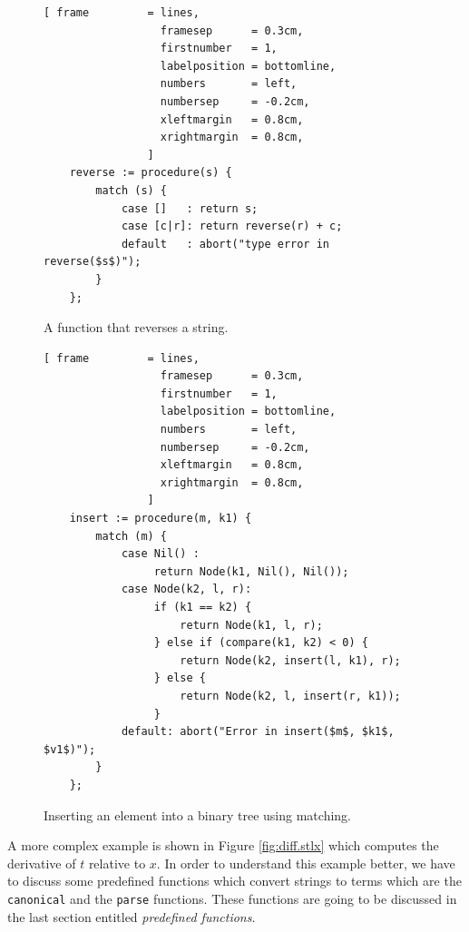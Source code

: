 \documentclass[11pt]{report}
\begin{document}
\begin{figure}[!ht]
\centering
\begin{Verbatim}[ frame         = lines, 
                  framesep      = 0.3cm, 
                  firstnumber   = 1,
                  labelposition = bottomline,
                  numbers       = left,
                  numbersep     = -0.2cm,
                  xleftmargin   = 0.8cm,
                  xrightmargin  = 0.8cm,
                ]
    reverse := procedure(s) {
        match (s) {
            case []   : return s;
            case [c|r]: return reverse(r) + c;
            default   : abort("type error in reverse($s$)");
        }
    };
\end{Verbatim}
\vspace*{-0.3cm}
\caption{A function that reverses a string.}
\label{fig:reverse.stlx}
\end{figure}

\begin{figure}[!ht]
\centering
\begin{Verbatim}[ frame         = lines, 
                  framesep      = 0.3cm, 
                  firstnumber   = 1,
                  labelposition = bottomline,
                  numbers       = left,
                  numbersep     = -0.2cm,
                  xleftmargin   = 0.8cm,
                  xrightmargin  = 0.8cm,
                ]
    insert := procedure(m, k1) {
        match (m) {
            case Nil() : 
                 return Node(k1, Nil(), Nil());
            case Node(k2, l, r): 
                 if (k1 == k2) {
                     return Node(k1, l, r);
                 } else if (compare(k1, k2) < 0) { 
                     return Node(k2, insert(l, k1), r);
                 } else {
                     return Node(k2, l, insert(r, k1));
                 }
            default: abort("Error in insert($m$, $k1$, $v1$)");
        }
    };
\end{Verbatim}
\vspace*{-0.3cm}
\caption{Inserting an element into a binary tree using matching.}
\label{fig:binary-tree.stlx}
\end{figure}

A more complex example is shown in Figure \ref{fig:diff.stlx} which computes the derivative of $t$ relative to $x$. In order to understand this example better, we have to discuss some predefined functions which convert strings to terms which are the \texttt{canonical} and the \texttt{parse} functions. These functions are going to be discussed in the last section entitled \textsl{predefined functions}.
\end{document}
